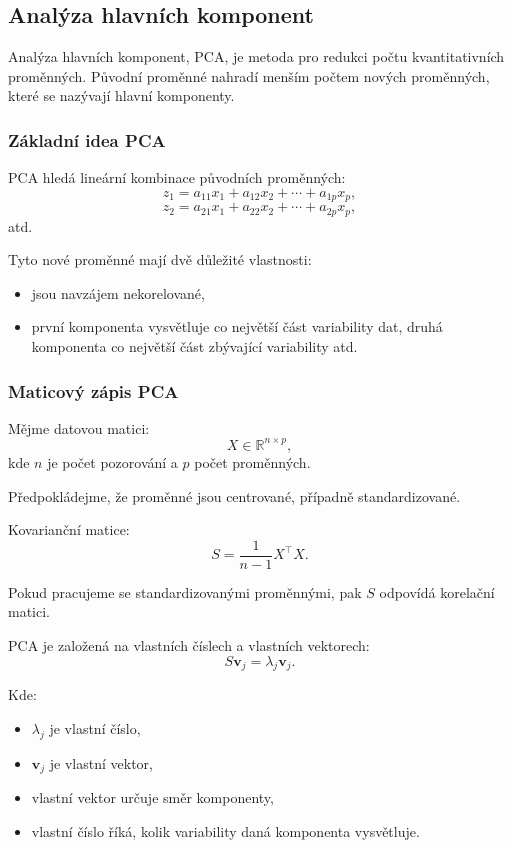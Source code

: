 \subsection{Analýza hlavních komponent}

Analýza hlavních komponent, PCA, je metoda pro redukci počtu kvantitativních proměnných.
Původní proměnné nahradí menším počtem nových proměnných, které se nazývají hlavní komponenty.

\subsubsection{Základní idea PCA}

PCA hledá lineární kombinace původních proměnných:
\[
z_1 = a_{11}x_1+a_{12}x_2+\cdots+a_{1p}x_p,
\]
\[
z_2 = a_{21}x_1+a_{22}x_2+\cdots+a_{2p}x_p,
\]
atd.

Tyto nové proměnné mají dvě důležité vlastnosti:
\begin{itemize}
    \item jsou navzájem nekorelované,
    \item první komponenta vysvětluje co největší část variability dat,
    druhá komponenta co největší část zbývající variability atd.
\end{itemize}

\subsubsection{Maticový zápis PCA}

Mějme datovou matici:
\[
X \in \mathbb{R}^{n \times p},
\]
kde $n$ je počet pozorování a $p$ počet proměnných.

Předpokládejme, že proměnné jsou centrované, případně standardizované.

Kovarianční matice:
\[
S = \frac{1}{n-1}X^\top X.
\]

Pokud pracujeme se standardizovanými proměnnými, pak $S$ odpovídá korelační matici.

PCA je založená na vlastních číslech a vlastních vektorech:
\[
S\mathbf{v}_j = \lambda_j \mathbf{v}_j.
\]

Kde:
\begin{itemize}
    \item $\lambda_j$ je vlastní číslo,
    \item $\mathbf{v}_j$ je vlastní vektor,
    \item vlastní vektor určuje směr komponenty,
    \item vlastní číslo říká, kolik variability daná komponenta vysvětluje.
\end{itemize}

